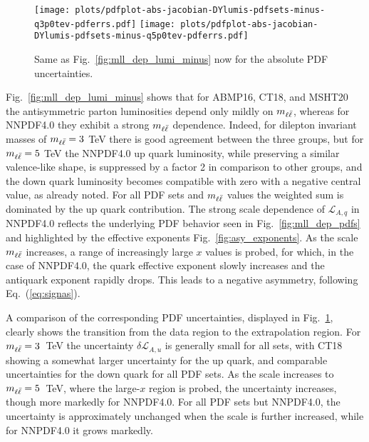 \begin{figure}[!t]
 \centering
 \texttt{[image: plots/pdfplot-abs-jacobian-DYlumis-pdfsets-minus-q3p0tev-pdferrs.pdf]}
 \texttt{[image: plots/pdfplot-abs-jacobian-DYlumis-pdfsets-minus-q5p0tev-pdferrs.pdf]}
 \caption{Same as Fig.~\ref{fig:mll_dep_lumi_minus} now for the absolute PDF uncertainties.
    }    
 \label{fig:mll_dep_lumi_minus_pdferrs}
\end{figure}

Fig.~\ref{fig:mll_dep_lumi_minus} shows that for ABMP16, CT18, and
MSHT20 the antisymmetric
parton luminosities depend only mildly on $m_{\ell\bar{\ell}}$, whereas for NNPDF4.0
they exhibit a strong $m_{\ell\bar{\ell}}$ dependence.
%
Indeed, for dilepton invariant masses of $m_{\ell\bar{\ell}}=3$ TeV there is good
agreement between the three groups, but
for $m_{\ell\bar{\ell}}=5$ TeV the NNPDF4.0 up quark luminosity, while preserving a
similar valence-like shape, is suppressed
by a factor 2 in comparison  to other groups, and the down quark luminosity becomes compatible with zero with a negative
central value,  as already noted. 
%
For all PDF sets and  $m_{\ell\bar{\ell}}$ values the weighted sum is dominated by the up quark contribution.
The strong scale dependence of $\mathcal{L}_{A,q}$ in NNPDF4.0
reflects the underlying PDF behavior seen in  Fig.~\ref{fig:mll_dep_pdfs}
and highlighted by the effective exponents Fig.~\ref{fig:asy_exponents}.
%
As the scale $m_{\ell\bar{\ell}}$ increases, a range of increasingly large $x$ values is probed,
for which, in the case of
NNPDF4.0, the quark effective exponent slowly increases and the
antiquark exponent rapidly drops.
%
This leads to a negative asymmetry, 
following  Eq.~(\ref{eq:signas}). 

A comparison of the corresponding PDF uncertainties, displayed in
Fig.~\ref{fig:mll_dep_lumi_minus_pdferrs}, clearly shows the transition
from the data region to the extrapolation region.
%
For
$m_{\ell\bar{\ell}}=3$~TeV the uncertainty $\delta \mathcal{L}_{A,u}$ is generally
small for all sets, with CT18
showing a somewhat larger uncertainty for the up quark, and comparable
uncertainties for the down quark for all PDF sets.
%
As the scale  increases to $m_{\ell\bar{\ell}}=5$~TeV, where the large-$x$ region is
probed,  the uncertainty 
increases, though more markedly for NNPDF4.0.
%
For all PDF sets but
NNPDF4.0, the
uncertainty is approximately unchanged when the scale is further increased,
while for NNPDF4.0 it grows markedly.

